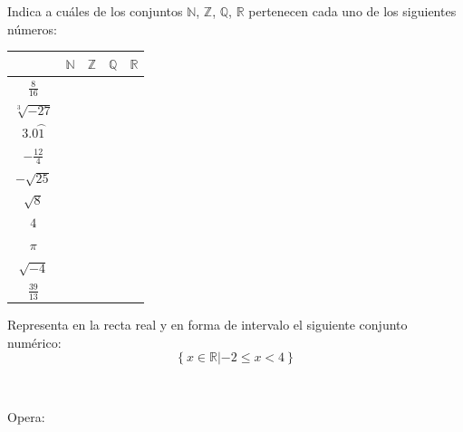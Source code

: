 \documentclass[addpoints,spanish, 12pt,a4paper]{exam}
\begin{document}
\begin{questions}

\question[2] Indica a cuáles de los conjuntos
$\mathbb{N}$, $\mathbb{Z}$, $\mathbb{Q}$, $\mathbb{R}$ pertenecen cada uno de los siguientes números:
\begin{center}
\begin{tabular}{|c |c |c |c |c|}\hline
&$\mathbb{N}$& $\mathbb{Z}$& $\mathbb{Q}$&$\mathbb{R}$\\ 
\hline
$\frac{8}{16}$&&&&\\
\hline
$\sqrt[3]{-27}$&&&&\\
\hline
$3.0\wideparen{1}$&&&&\\
\hline
$-\frac{12}{4}$&&&&\\
\hline
$-\sqrt{25}$&&&&\\
\hline
$\sqrt{8}$&&&&\\
\hline
$4$&&&&\\
\hline
$\pi$&&&&\\
\hline
$\sqrt{-4}$&&&&\\
\hline
$\frac{39}{13}$&&&&\\
\hline
\end{tabular}

\end{center}

\addpoints

\question[1] Representa en la recta real y en forma de intervalo el siguiente conjunto numérico:
\addpoints %
$$\left\{ x \in \mathbb{R} \left| -2 \leqslant x < 4 \right. \right\}$$

\begin{solution}
$ $ 
\end{solution}

\question[4] Opera:
\noaddpoints %

\end{questions}
\end{document}

